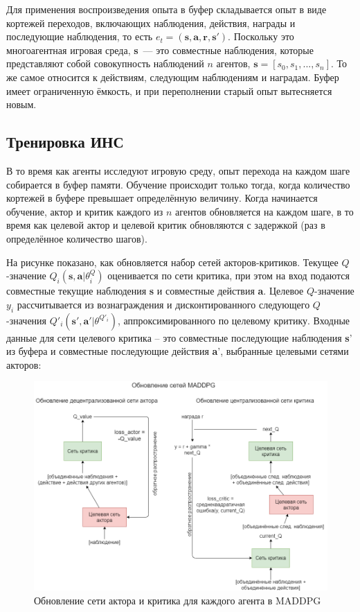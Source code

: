 Для применения воспроизведения опыта в буфер складывается опыт в виде кортежей переходов, включающих наблюдения, действия, награды и последующие наблюдения, то есть ${e_t = (\mathbf{s, a, r, s'})}$. Поскольку это многоагентная игровая среда, \textbf{s}~--- это совместные наблюдения, которые представляют собой совокупность наблюдений $n$ агентов, ${\mathbf{s} = [s_0, s_1, ..., s_n]}$. То же самое относится к действиям, следующим наблюдениям и наградам. Буфер имеет ограниченную ёмкость, и при переполнении старый опыт вытесняется новым.

\subsection{Тренировка ИНС}

В то время как агенты исследуют игровую среду, опыт перехода на каждом шаге собирается в буфер памяти. Обучение происходит только тогда, когда количество кортежей в буфере превышает определённую величину. Когда начинается обучение, актор и критик каждого из $n$ агентов обновляется на каждом шаге, в то время как целевой актор и целевой критик обновляются с задержкой (раз в определённое количество шагов).

На рисунке  показано, как обновляется набор сетей акторов-критиков. Текущее $Q$-значение $Q_i(\mathbf{s, a}|\theta ^Q_i)$ оценивается по сети критика, при этом на вход подаются совместные текущие наблюдения \textbf{s} и совместные действия \textbf{a}. Целевое $Q$-значение $y_i$ рассчитывается из вознаграждения и дисконтированного следующего $Q$-значения $Q'_i(\mathbf{s', a'}|\theta ^{Q'_i})$, аппроксимированного по целевому критику. Входные данные для сети целевого критика – это совместные последующие наблюдения \textbf{s}' из буфера и совместные последующие действия \textbf{a}', выбранные целевыми сетями акторов:

\begin{figure}[ht!]
    \center
    \includegraphics [scale=0.5] {my_folder/images/ch3/maddpg-updating-networks.png}
    \caption{Обновление сети актора и критика для каждого агента в MADDPG}
    \label{fig:ch3-network-training}
\end{figure}

